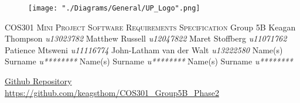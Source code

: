 \begin{titlepage}
\begin{center}
\begin{figure}[t]
\centering
\texttt{[image: "./Diagrams/General/UP\_Logo".png]}
\end{figure}
\begin{flushright}
\textsc{\LARGE COS301 Mini Project \newline\newline Software Requirements \newline   Specification}
\newline\newline \Large Group 5B \newline\newline
\large
Keagan Thompson    \emph{u13023782} \newline
Matthew Russell    \emph{u12047822} \newline
Maret Stoffberg    \emph{u11071762} \newline
Patience Mtsweni   \emph{u11116774} \newline
John-Latham van der Walt \emph{u13222580} \newline
Name(s) Surname    \emph{u********} \newline
Name(s) Surname    \emph{u********} \newline
Name(s) Surname    \emph{u********} \newline
\end{flushright}
\vfill
\href{https://github.com/keagsthom/COS301_Group5B_Phase2}{Github Repository}\\
\url{https://github.com/keagsthom/COS301_Group5B_Phase2}
\end{center}
\end{titlepage}



